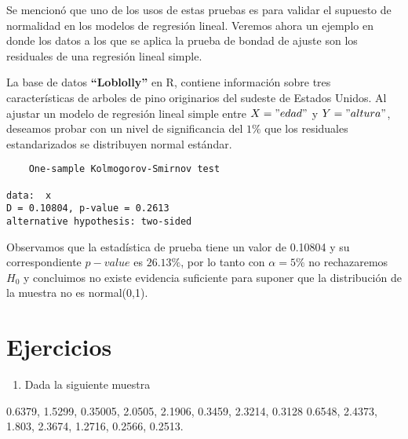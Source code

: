 \documentclass[
  a4paper,
  oneside,
  openany]{book}
\newenvironment{Shaded}{\begin{snugshade}}{\end{snugshade}}
\newcommand{\DecValTok}[1]{\textcolor[rgb]{0.00,0.00,0.81}{#1}}
\newcommand{\KeywordTok}[1]{\textcolor[rgb]{0.13,0.29,0.53}{\textbf{#1}}}
\newcommand{\NormalTok}[1]{#1}
\newcommand{\OperatorTok}[1]{\textcolor[rgb]{0.81,0.36,0.00}{\textbf{#1}}}
\newcommand{\StringTok}[1]{\textcolor[rgb]{0.31,0.60,0.02}{#1}}
\providecommand{\tightlist}{%
  \setlength{\itemsep}{0pt}\setlength{\parskip}{0pt}}
\begin{document}
Se mencionó que uno de los usos de estas pruebas es para validar el supuesto de normalidad en los modelos de regresión lineal. Veremos ahora un ejemplo en donde los datos a los que se aplica la prueba de bondad de ajuste son los residuales de una regresión lineal simple.

La base de datos \textbf{``Loblolly''} en R, contiene información sobre tres características de arboles de pino originarios del sudeste de Estados Unidos. Al ajustar un modelo de regresión lineal simple entre \(X="edad"\) y \(Y="altura"\), deseamos probar con un nivel de significancia del \(1\%\) que los residuales estandarizados se distribuyen normal estándar.

\begin{Shaded}
\end{Shaded}

\begin{verbatim}
    One-sample Kolmogorov-Smirnov test

data:  x
D = 0.10804, p-value = 0.2613
alternative hypothesis: two-sided
\end{verbatim}

Observamos que la estadística de prueba tiene un valor de 0.10804 y su correspondiente \(p-value\) es \(26.13\%\), por lo tanto con \(\alpha=5\%\) no rechazaremos \(H_0\) y concluimos no existe evidencia suficiente para suponer que la distribución de la muestra no es normal(0,1).

\hypertarget{ejercicios-9}{%
\section{Ejercicios}\label{ejercicios-9}}

\begin{enumerate}
\def\labelenumi{\arabic{enumi}.}
\tightlist
\item
  Dada la siguiente muestra
\end{enumerate}

0.6379, 1.5299, 0.35005, 2.0505, 2.1906, 0.3459, 2.3214, 0.3128
0.6548, 2.4373, 1.803, 2.3674, 1.2716, 0.2566, 0.2513.
\end{document}
